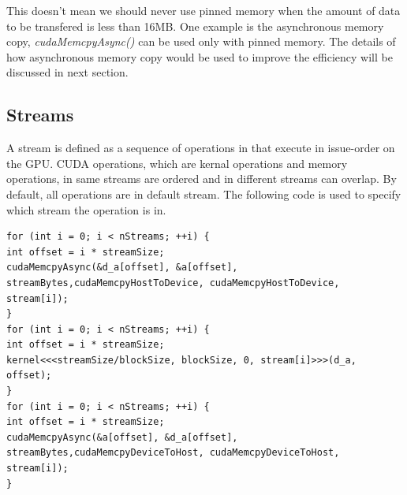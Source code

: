 \documentclass[journal,12pt,onecolumn,draftclsnofoot]{ieeeconf}  %
\begin{document}
This doesn't mean we should never use pinned memory when the amount of data to be transfered is less than 16MB. One example is the asynchronous memory copy, \textit{cudaMemcpyAsync()} can be used only with pinned memory. The details of how asynchronous memory copy would be used to improve the efficiency will be discussed in next section.

\subsection{Streams}
A stream is defined as a sequence of operations in that execute in issue-order on the GPU. CUDA operations, which are kernal operations and memory operations, in same streams are ordered and in different streams can overlap. By default, all operations are in default stream. The following code is used to specify which stream the operation is in. \par

\begin{lstlisting}
for (int i = 0; i < nStreams; ++i) {
int offset = i * streamSize;
cudaMemcpyAsync(&d_a[offset], &a[offset], streamBytes,cudaMemcpyHostToDevice, cudaMemcpyHostToDevice, stream[i]);
}
for (int i = 0; i < nStreams; ++i) {
int offset = i * streamSize;
kernel<<<streamSize/blockSize, blockSize, 0, stream[i]>>>(d_a, offset);
}
for (int i = 0; i < nStreams; ++i) {
int offset = i * streamSize;
cudaMemcpyAsync(&a[offset], &d_a[offset], streamBytes,cudaMemcpyDeviceToHost, cudaMemcpyDeviceToHost, stream[i]);
}

\end{lstlisting}
\end{document}
